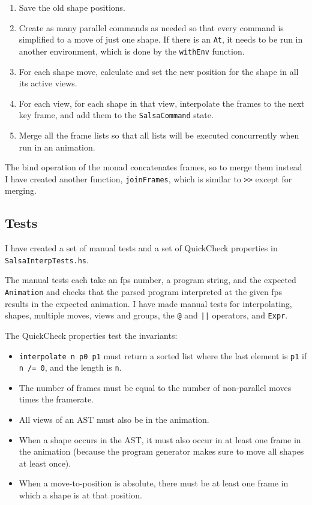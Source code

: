 \documentclass[10pt,a4paper]{article}
\begin{document}
\begin{enumerate}
\item Save the old shape positions.
\item Create as many parallel commands as needed so that every command is
  simplified to a move of just one shape.  If there is an \verb+At+, it needs to
  be run in another environment, which is done by the \verb+withEnv+ function.
\item For each shape move, calculate and set the new position for the shape in
  all its active views.
\item For each view, for each shape in that view, interpolate the frames to the
  next key frame, and add them to the \verb+SalsaCommand+ state.
\item Merge all the frame lists so that all lists will be executed concurrently
  when run in an animation.
\end{enumerate}

The bind operation of the monad concatenates frames, so to merge them instead I
have created another function, \verb+joinFrames+, which is similar to \verb+>>+
except for merging.


\subsection{Tests}

I have created a set of manual tests and a set of QuickCheck properties in
\verb+SalsaInterpTests.hs+.

The manual tests each take an fps number, a program string, and the expected
\verb+Animation+ and checks that the parsed program interpreted at the given fps
results in the expected animation.  I have made manual tests for interpolating,
shapes, multiple moves, views and groups, the \verb+@+ and \verb+||+ operators,
and \verb+Expr+.

The QuickCheck properties test the invariants:
\begin{itemize}
\item \verb+interpolate n p0 p1+ must return a sorted list where the last
  element is \verb+p1+ if \verb+n /= 0+, and the length is \verb+n+.
\item The number of frames must be equal to the number of non-parallel moves
  times the framerate.
\item All views of an AST must also be in the animation.
\item When a shape occurs in the AST, it must also occur in at least one frame
  in the animation (because the program generator makes sure to move all shapes
  at least once).
\item When a move-to-position is absolute, there must be at least one frame in
  which a shape is at that position.
\end{itemize}
\end{document}
